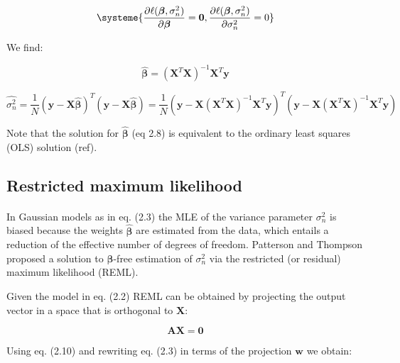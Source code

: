\begin{equation} \label{eq7:Linear_regression_MLE_system}
\systeme{
    \dfrac{\partial \ell(\boldsymbol{\beta}, \sigma_n^2)}{\partial \boldsymbol{\beta}} = \mathbf{0},
    \dfrac{\partial \ell(\boldsymbol{\beta}, \sigma_n^2)}{\partial \sigma_n^2} = 0
    }
\end{equation}

We find:

\begin{equation} \label{eq8:Linear_regression_MLE_solution_beta}
\hat{\boldsymbol{\beta}} = (\mathbf{X}^T\mathbf{X})^{-1}\mathbf{X}^T\mathbf{y} 
\end{equation}

\begin{equation} \label{eq9:Linear_regression_MLE_solution_sigma}
 \hat{\sigma_n^2} = \frac{1}{N}(\mathbf{y}-\mathbf{X}\hat{\boldsymbol{\beta}})^T(\mathbf{y}-\mathbf{X}\hat{\boldsymbol{\beta}}) = \frac{1}{N}(\mathbf{y}-\mathbf{X}(\mathbf{X}^T\mathbf{X})^{-1}\mathbf{X}^T\mathbf{y})^T(\mathbf{y}-\mathbf{X}(\mathbf{X}^T\mathbf{X})^{-1}\mathbf{X}^T\mathbf{y}) 
\end{equation}

Note that the solution for $\hat{\boldsymbol{\beta}}$ (eq 2.8) is equivalent to the ordinary least squares (OLS) solution (ref).


\subsection{Restricted maximum likelihood}

In Gaussian models as in eq. (2.3) the MLE of the variance parameter $\hat{\sigma_n^2}$ is biased because the weights $\hat{\boldsymbol{\beta}}$ are estimated from the data, which entails a reduction of the effective number of degrees of freedom.
Patterson and Thompson \cite{patterson1971recovery} proposed a solution to $\boldsymbol{\beta}$-free estimation of $\sigma_n^2$ via the restricted (or residual) maximum likelihood (REML).

Given the model in eq. (2.2) REML can be obtained by projecting the output vector in a space that is orthogonal to $\mathbf{X}$:

\begin{equation}
    \mathbf{A}\mathbf{X} = \mathbf{0}
\end{equation}

Using eq. (2.10) and rewriting eq. (2.3) in terms of the projection $\mathbf{w}$ we obtain:

